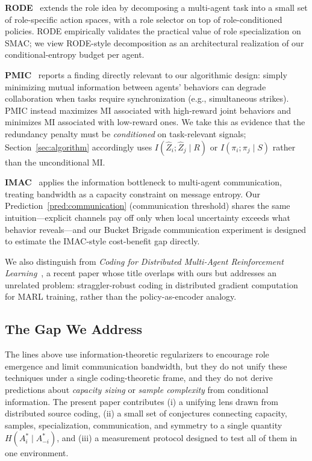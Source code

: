 \documentclass[10pt, letterpaper]{article}
\begin{document}
\textbf{RODE}~\cite{wang2021rode} extends the role idea by decomposing a multi-agent task into a small set of role-specific action spaces, with a role selector on top of role-conditioned policies. RODE empirically validates the practical value of role specialization on SMAC; we view RODE-style decomposition as an architectural realization of our conditional-entropy budget per agent.

\textbf{PMIC}~\cite{li2022pmic} reports a finding directly relevant to our algorithmic design: simply minimizing mutual information between agents' behaviors can degrade collaboration when tasks require synchronization (e.g., simultaneous strikes). PMIC instead maximizes MI associated with high-reward joint behaviors and minimizes MI associated with low-reward ones. We take this as evidence that the redundancy penalty must be \emph{conditioned} on task-relevant signals; Section~\ref{sec:algorithm} accordingly uses $I(\hat{Z}_i; \hat{Z}_j \mid R)$ or $I(\pi_i; \pi_j \mid S)$ rather than the unconditional MI.

\textbf{IMAC}~\cite{wang2020imac} applies the information bottleneck to multi-agent communication, treating bandwidth as a capacity constraint on message entropy. Our Prediction~\ref{pred:communication} (communication threshold) shares the same intuition---explicit channels pay off only when local uncertainty exceeds what behavior reveals---and our Bucket Brigade communication experiment is designed to estimate the IMAC-style cost-benefit gap directly.

We also distinguish from \emph{Coding for Distributed Multi-Agent Reinforcement Learning}~\cite{wang2021coding}, a recent paper whose title overlaps with ours but addresses an unrelated problem: straggler-robust coding in distributed gradient computation for MARL training, rather than the policy-as-encoder analogy.

\subsection{The Gap We Address}

The lines above use information-theoretic regularizers to encourage role emergence and limit communication bandwidth, but they do not unify these techniques under a single coding-theoretic frame, and they do not derive predictions about \emph{capacity sizing} or \emph{sample complexity} from conditional information. The present paper contributes (i) a unifying lens drawn from distributed source coding, (ii) a small set of conjectures connecting capacity, samples, specialization, communication, and symmetry to a single quantity $H(A_i^* \mid A_{-i}^*)$, and (iii) a measurement protocol designed to test all of them in one environment.
\end{document}
